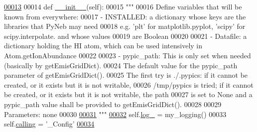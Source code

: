 \begin{DoxyCode}
\hypertarget{classpyneb_1_1utils_1_1_config_1_1___config_l00013}{}\hyperlink{classpyneb_1_1utils_1_1_config_1_1___config_ae072405b2668038f94c7751f937eb58f}{00013} 
00014     \textcolor{keyword}{def }\hyperlink{classpyneb_1_1utils_1_1_config_1_1___config_ae072405b2668038f94c7751f937eb58f}{\_\_init\_\_}(self):
00015         \textcolor{stringliteral}{"""}
00016 \textcolor{stringliteral}{        Define variables that will be known from everywhere:}
00017 \textcolor{stringliteral}{        - INSTALLED: a dictionary whose keys are the libraries that PyNeb may need}
00018 \textcolor{stringliteral}{            e.g. 'plt' for matplotlib.pyplot, 'scipy' for scipy.interpolate. and whose values}
00019 \textcolor{stringliteral}{            are Boolean}
00020 \textcolor{stringliteral}{        }
00021 \textcolor{stringliteral}{        - Datafile: a dictionary holding the HI atom, which can be used intensively in Atom.getIonAbundance}
00022 \textcolor{stringliteral}{        }
00023 \textcolor{stringliteral}{        - pypic\_path: This is only set when needed (basically by getEmisGridDict).}
00024 \textcolor{stringliteral}{            The default value for the pypic\_path parameter of getEmisGridDict().}
00025 \textcolor{stringliteral}{            The first try is ./.pypics: if it cannot be created, or it exists but it is not writable, }
00026 \textcolor{stringliteral}{            /tmp/pypics is tried; if it cannot be created, or it exists but it is not writable, the path}
00027 \textcolor{stringliteral}{            is set to None and a pypic\_path value shall be provided to getEmisGridDict().}
00028 \textcolor{stringliteral}{        }
00029 \textcolor{stringliteral}{        Parameters: none}
00030 \textcolor{stringliteral}{        }
\hypertarget{classpyneb_1_1utils_1_1_config_1_1___config_l00031}{}\hyperlink{classpyneb_1_1utils_1_1_config_1_1___config_a8304de6467642234fcf5a7ae1e7a16bd}{00031} \textcolor{stringliteral}{        """}
\hypertarget{classpyneb_1_1utils_1_1_config_1_1___config_l00032}{}\hyperlink{classpyneb_1_1utils_1_1_config_1_1___config_abf04542e5670abea107260ca7a6baf6d}{00032}         self.\hyperlink{classpyneb_1_1utils_1_1_config_1_1___config_a8304de6467642234fcf5a7ae1e7a16bd}{log\_} = my\_logging()
00033         self.\hyperlink{classpyneb_1_1utils_1_1_config_1_1___config_abf04542e5670abea107260ca7a6baf6d}{calling} = \textcolor{stringliteral}{'\_Config'}
\hypertarget{classpyneb_1_1utils_1_1_config_1_1___config_l00034}{}\hyperlink{classpyneb_1_1utils_1_1_config_1_1___config_ae07a752629612175b8000d374904b22a}{00034}         

\end{DoxyCode}
